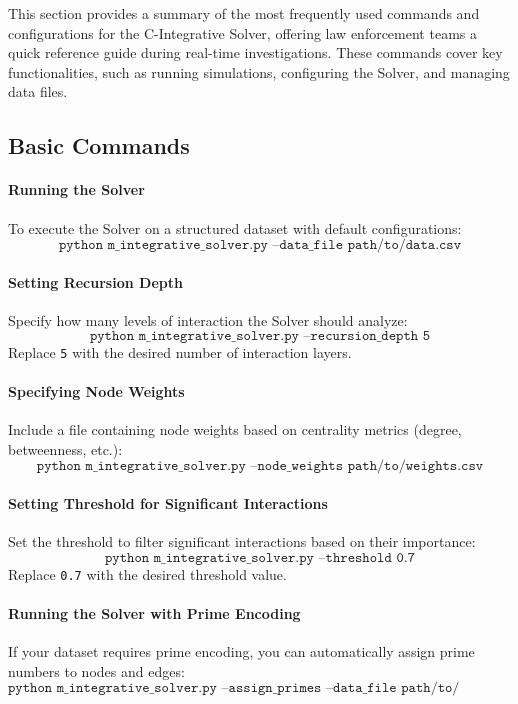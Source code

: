 \documentclass[%
 preprint, linenumbers,
 amsmath,amssymb,
 aps, physrev,
]{revtex4-2}
\begin{document}
This section provides a summary of the most frequently used commands and configurations for the C-Integrative Solver, offering law enforcement teams a quick reference guide during real-time investigations. These commands cover key functionalities, such as running simulations, configuring the Solver, and managing data files.

\subsection*{Basic Commands}

\paragraph{Running the Solver}
To execute the Solver on a structured dataset with default configurations:
\[
\texttt{python m\_integrative\_solver.py --data\_file path/to/data.csv}
\]

\paragraph{Setting Recursion Depth}
Specify how many levels of interaction the Solver should analyze:
\[
\texttt{python m\_integrative\_solver.py --recursion\_depth 5}
\]
Replace \texttt{5} with the desired number of interaction layers.

\paragraph{Specifying Node Weights}
Include a file containing node weights based on centrality metrics (degree, betweenness, etc.):
\[
\texttt{python m\_integrative\_solver.py --node\_weights path/to/weights.csv}
\]

\paragraph{Setting Threshold for Significant Interactions}
Set the threshold to filter significant interactions based on their importance:
\[
\texttt{python m\_integrative\_solver.py --threshold 0.7}
\]
Replace \texttt{0.7} with the desired threshold value.

\paragraph{Running the Solver with Prime Encoding}
If your dataset requires prime encoding, you can automatically assign prime numbers to nodes and edges:
\[
\texttt{python m\_integrative\_solver.py --assign\_primes --data\_file path/to/data.csv}
\]
\end{document}

